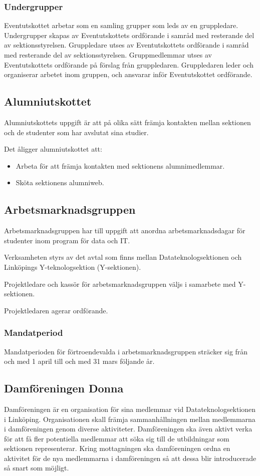 \documentclass{datateknologsektionen-document}
\begin{document}
\subsubsection{Undergrupper}
Eventutskottet arbetar som en samling grupper som leds av en gruppledare. Undergrupper skapas
av Eventutskottets ordförande i samråd med resterande del av sektionsstyrelsen.
Gruppledare utses av Eventutskottets ordförande i samråd med resterande del av sektionsstyrelsen. Gruppmedlemmar utses av
Eventutskottets ordförande på förslag från gruppledaren. Gruppledaren leder och
organiserar arbetet inom gruppen, och ansvarar inför Eventutskottet ordförande.

\subsection{Alumniutskottet}
Alumniutskottets uppgift är att på olika sätt främja kontakten mellan sektionen
och de studenter som har avslutat sina studier.

Det åligger alumniutskottet att:
\begin{itemize}
  \item Arbeta för att främja kontakten med sektionens alumnimedlemmar.
  \item Sköta sektionens alumniweb.
\end{itemize}

\subsection{Arbetsmarknadsgruppen}
\label{arbetsmarknadsgruppen}
Arbetsmarknadsgruppen har till uppgift att anordna arbetsmarknadsdagar för studenter
inom program för data och IT.

Verksamheten styrs av det avtal som finns mellan Datateknologsektionen och Linköpings
Y-teknologsektion (Y-sektionen).

Projektledare och kassör för arbetsmarknadsgruppen väljs i samarbete med Y-sektionen.

Projektledaren agerar ordförande.

\subsubsection{Mandatperiod}
Mandatperioden för förtroendevalda i arbetsmarknadsgruppen sträcker sig från och med 1 april till och med 31 mars följande år.

\subsection{Damföreningen Donna}
Damföreningen är en organisation för sina medlemmar vid Datateknologsektionen i Linköping.
Organisationen skall främja sammanhållningen mellan medlemmarna i damföreningen genom
diverse aktiviteter. Damföreningen ska även aktivt verka för att få fler potentiella
medlemmar att söka sig till de utbildningar som sektionen representerar. Kring
mottagningen ska damföreningen ordna en aktivitet för de nya medlemmarna i damföreningen
så att dessa blir introducerade så snart som möjligt.
\end{document}
